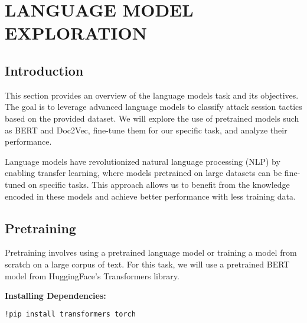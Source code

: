 

\section{LANGUAGE MODEL EXPLORATION}


    \subsection{Introduction}
    
        This section provides an overview of the language models task and its objectives. The goal is to leverage advanced language models to classify attack session tactics based on the provided dataset. We will explore the use of pretrained models such as BERT and Doc2Vec, fine-tune them for our specific task, and analyze their performance.

        Language models have revolutionized natural language processing (NLP) by enabling transfer learning, where models pretrained on large datasets can be fine-tuned on specific tasks. This approach allows us to benefit from the knowledge encoded in these models and achieve better performance with less training data.

    \subsection{Pretraining}
    
        Pretraining involves using a pretrained language model or training a model from scratch on a large corpus of text. For this task, we will use a pretrained BERT model from HuggingFace's Transformers library.

        \textbf{Installing Dependencies:}

        \begin{lstlisting}[language=bash, caption={Install required packages}, label={lst:install_packages}]
            !pip install transformers torch
        \end{lstlisting}
        
